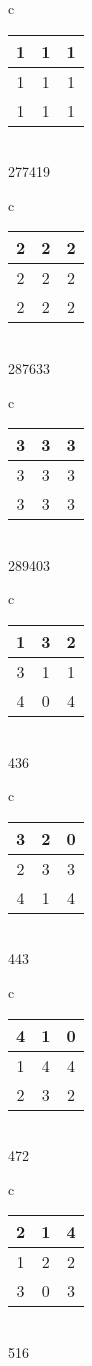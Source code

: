 \documentclass[11pt]{article}
\begin{document}
\begin{tabular}{c}
\begin{tabular}{|c|c|c|}
\hline
1&1&1\\
\hline
1&1&1\\
\hline
1&1&1\\
\hline
\end{tabular}\\
277419\\
\end{tabular}
\begin{tabular}{c}
\begin{tabular}{|c|c|c|}
\hline
2&2&2\\
\hline
2&2&2\\
\hline
2&2&2\\
\hline
\end{tabular}\\
287633\\
\end{tabular}
\begin{tabular}{c}
\begin{tabular}{|c|c|c|}
\hline
3&3&3\\
\hline
3&3&3\\
\hline
3&3&3\\
\hline
\end{tabular}\\
289403\\
\end{tabular}
\begin{tabular}{c}
\begin{tabular}{|c|c|c|}
\hline
1&3&2\\
\hline
3&1&1\\
\hline
4&0&4\\
\hline
\end{tabular}\\
436\\
\end{tabular}
\begin{tabular}{c}
\begin{tabular}{|c|c|c|}
\hline
3&2&0\\
\hline
2&3&3\\
\hline
4&1&4\\
\hline
\end{tabular}\\
443\\
\end{tabular}
\begin{tabular}{c}
\begin{tabular}{|c|c|c|}
\hline
4&1&0\\
\hline
1&4&4\\
\hline
2&3&2\\
\hline
\end{tabular}\\
472\\
\end{tabular}
\begin{tabular}{c}
\begin{tabular}{|c|c|c|}
\hline
2&1&4\\
\hline
1&2&2\\
\hline
3&0&3\\
\hline
\end{tabular}\\
516\\
\end{tabular}

\end{document}
